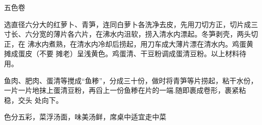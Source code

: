 \begin{recipe}{五色卷}

\ingredients



\preparation

\step 选直径六分大的红萝卜、青笋，连同白萝卜各洗净去皮，先用刀切方正，切片成三
寸长、六分宽的薄片各六片，在沸水内沮软，捞入清水内漂起。冬笋剥壳，两头切正，在
沸水内煮熟，在清水内冷却后捞起，用刀车成大薄片漂在清水内。鸡蛋黄摊成蛋皮（不要
摊老）呈浅黄色。鸡蛋清、干豆粉调成蛋清豆粉。以上材料待用。

\step 鱼肉、肥肉、蛋清等搅成“鱼糁”，分成三十份，做时将青笋等片捞起，粘干水份，
一片一片地抹上蛋清豆粉，再舀上一份鱼糁在片的一端.随即裹成卷形，裹紧粘稳，交头
处向下。

\features

色分五彩，菜浮汤面，味美汤鲜，席桌中适宜走中菜

\end{recipe}

